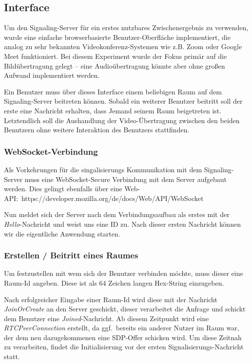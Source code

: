 \documentclass{article}
\begin{document}
\begin{onecolumn}
\subsection{Interface}

Um den Signaling-Server für ein erstes nutzbares Zwischenergebnis zu verwenden,
wurde eine einfache browserbasierte Benutzer-Oberfläche implementiert, die
analog zu sehr bekannten Videokonferenz-Systemen wie z.B. Zoom oder Google Meet
funktioniert. Bei diesem Experiment wurde der Fokus primär auf die
Bildübertragung gelegt – eine Audioübertragung könnte aber ohne großen Aufwand
implementiert werden.

Ein Benutzer muss über dieses Interface einem beliebigen Raum auf dem
Signaling-Server beitreten können. Sobald ein weiterer Benutzer beitritt soll
der erste eine Nachricht erhalten, dass Jemand seinem Raum beigetreten ist.
Letztendlich soll die Aushandlung der Video-Übertragung zwischen den beiden
Benutzern ohne weitere Interaktion des Benutzers stattfinden.

\subsubsection{WebSocket-Verbindung}

Als Vorkehrungen für die singalisierungs Kommunikation mit dem Signaling-Server
muss eine WebSocket-Secure Verbindung mit dem Server aufgebaut werden. Dies
gelingt ebenfalls über eine Web-API:\
https://developer.mozilla.org/de/docs/Web/API/WebSocket

Nun meldet sich der Server nach dem Verbindungsaufbau als erstes mit der
\textit{Hello}-Nachricht und weist uns eine ID zu. Nach dieser ersten Nachricht
können wir die eigentliche Anwendung starten.

\subsubsection{Erstellen / Beitritt eines Raumes}

Um festzustellen mit wem sich der Benutzer verbinden möchte, muss dieser
eine Raum-Id angeben. Diese ist als 64 Zeichen langen Hex-String einzugeben.

Nach erfolgreicher Eingabe einer Raum-Id wird diese mit der Nachricht
\textit{JoinOrCreate} an den Server geschickt, dieser verarbeitet die Anfrage
und schickt dem Benutzer eine \textit{Joined}-Nachricht. Ab diesem Zeitpunkt
wird eine \textit{RTCPeerConnection} erstellt, da ggf.\ bereits ein anderer
Nutzer im Raum war, der dem neu dazugekommenen eine SDP-Offer schicken wird.
Um diese Zeitnah zu verarbeiten, findet die Initialisierung vor der ersten
Signalisierungs-Nachricht statt.


\end{onecolumn}
\end{document}
